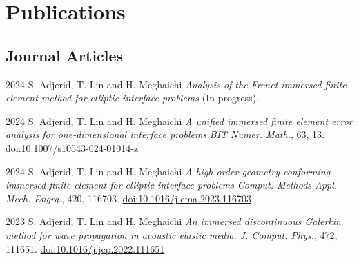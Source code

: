 \documentclass[11pt,letterpaper]{report}
\begin{document}
    \section*{Publications}

    \subsection*{Journal Articles}

    \begin{tablist}




        \item[2024]\tab{} S. Adjerid, T. Lin and H. Meghaichi \textit{Analysis of the Frenet immersed finite element method for  elliptic interface problems} (In progress). 
        

        \item[2024] \tab{}S. Adjerid, T. Lin and H. Meghaichi \textit{A unified immersed finite element error analysis for one-dimensional interface problems} \textit{BIT Numer. Math.}, 63, 13.  \href{https://doi.org/10.1007/s10543-024-01014-z}{ 	doi:10.1007/s10543-024-01014-z}


        \item[2024] \tab{}S. Adjerid, T. Lin and H. Meghaichi \textit{A high order geometry conforming immersed finite element for
        elliptic interface problems} \textit{Comput. Methods Appl. Mech. Engrg.}, 420, 116703. \href{https://doi.org/10.1016/j.cma.2023.116703}{doi:10.1016/j.cma.2023.116703} 

        \item[2023] \tab{}S. Adjerid, T. Lin and H. Meghaichi \textit{An immersed discontinuous Galerkin method for wave propagation in acoustic elastic media.} \textit{J. Comput. Phys.}, 472, 111651. \href{https://doi.org/10.1016/j.jcp.2022.111651}{doi:10.1016/j.jcp.2022.111651} 
    \end{tablist}
\end{document}
